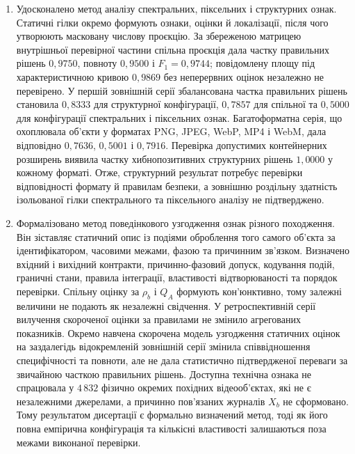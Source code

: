 \begin{enumerate}[label=\arabic*.]
\item Удосконалено метод аналізу спектральних, піксельних і структурних ознак. Статичні гілки окремо формують ознаки, оцінки й локалізації, після чого утворюють масковану числову проєкцію. За збереженою матрицею внутрішньої перевірної частини спільна проєкція дала частку правильних рішень $0{,}9750$, повноту $0{,}9500$ і $F_1=0{,}9744$; повідомлену площу під характеристичною кривою $0{,}9869$ без неперервних оцінок незалежно не перевірено. У першій зовнішній серії збалансована частка правильних рішень становила $0{,}8333$ для структурної конфігурації, $0{,}7857$ для спільної та $0{,}5000$ для конфігурації спектральних і піксельних ознак. Багатоформатна серія, що охоплювала об’єкти у форматах PNG, JPEG, WebP, MP4 і WebM, дала відповідно $0{,}7636$, $0{,}5001$ і $0{,}7916$. Перевірка допустимих контейнерних розширень виявила частку хибнопозитивних структурних рішень $1{,}0000$ у кожному форматі. Отже, структурний результат потребує перевірки відповідності формату й правилам безпеки, а зовнішню роздільну здатність ізольованої гілки спектрального та піксельного аналізу не підтверджено.

\item Формалізовано метод поведінкового узгодження ознак різного походження. Він зіставляє статичний опис із подіями оброблення того самого об’єкта за ідентифікатором, часовими межами, фазою та причинним зв’язком. Визначено вхідний і вихідний контракти, причинно-фазовий допуск, кодування подій, граничні стани, правила інтеграції, властивості відтворюваності та порядок перевірки. Спільну оцінку за $\rho_b$ і $Q_A$ формують кон’юнктивно, тому залежні величини не подають як незалежні свідчення. У ретроспективній серії вилучення скороченої оцінки за правилами не змінило агрегованих показників. Окремо навчена скорочена модель узгодження статичних оцінок на заздалегідь відокремленій зовнішній серії змінила співвідношення специфічності та повноти, але не дала статистично підтвердженої переваги за звичайною часткою правильних рішень. Доступна технічна ознака не спрацювала у $4\,832$ фізично окремих похідних відеооб’єктах, які не є незалежними джерелами, а причинно пов’язаних журналів $X_b$ не сформовано. Тому результатом дисертації є формально визначений метод, тоді як його повна емпірична конфігурація та кількісні властивості залишаються поза межами виконаної перевірки.


\end{enumerate}
